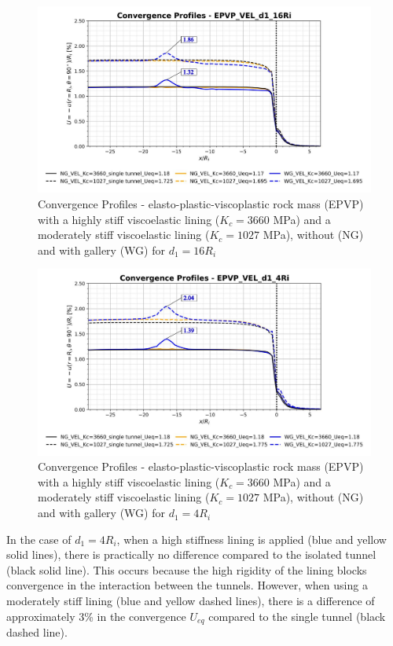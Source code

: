 \documentclass[a4paper,fleqn]{cas-sc}
\begin{document}
\begin{figure}[h!]
	\centering
	\includegraphics[scale=0.5]{Convergence Profiles - EPVP_VEL_d1_16Ri.pdf}
	\caption{Convergence Profiles - elasto-plastic-viscoplastic rock mass (EPVP) with a highly stiff viscoelastic lining ($K_c = 3660$ MPa) and a moderately stiff viscoelastic lining ($K_c = 1027$ MPa), without (NG) and with gallery (WG) for $d_1 = 16R_i$}
	\label{EPVP_VEL_d1_16Ri}
\end{figure}
\FloatBarrier

\begin{figure}[h!]
	\centering
	\includegraphics[scale=0.5]{Convergence Profiles - EPVP_VEL_d1_4Ri.pdf}
	\caption{Convergence Profiles - elasto-plastic-viscoplastic rock mass (EPVP) with a highly stiff viscoelastic lining ($K_c = 3660$ MPa) and a moderately stiff viscoelastic lining ($K_c = 1027$ MPa), without (NG) and with gallery (WG) for $d_1 = 4R_i$}
	\label{EPVP_VEL_d1_4Ri}
\end{figure}
\FloatBarrier

In the case of $d_1=4R_i$, when a high stiffness lining is applied (blue and yellow solid lines), there is practically no difference compared to the isolated tunnel (black solid line). This occurs because the high rigidity of the lining blocks convergence in the interaction between the tunnels. However, when using a moderately stiff lining (blue and yellow dashed lines), there is a difference of approximately 3\% in the convergence $U_{eq}$ compared to the single tunnel (black dashed line).
\end{document}

